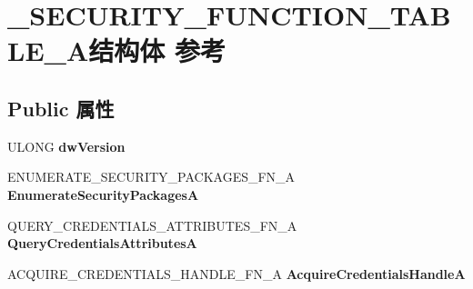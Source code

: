 \hypertarget{struct___s_e_c_u_r_i_t_y___f_u_n_c_t_i_o_n___t_a_b_l_e___a}{}\section{\+\_\+\+S\+E\+C\+U\+R\+I\+T\+Y\+\_\+\+F\+U\+N\+C\+T\+I\+O\+N\+\_\+\+T\+A\+B\+L\+E\+\_\+\+A结构体 参考}
\label{struct___s_e_c_u_r_i_t_y___f_u_n_c_t_i_o_n___t_a_b_l_e___a}
\subsection*{Public 属性}
\begin{DoxyCompactItemize}
\item 
\mbox{\label{struct___s_e_c_u_r_i_t_y___f_u_n_c_t_i_o_n___t_a_b_l_e___a_ac8229f76315b79cc90fe49938372a9fd}} 
U\+L\+O\+NG {\bfseries dw\+Version}
\item 
\mbox{\label{struct___s_e_c_u_r_i_t_y___f_u_n_c_t_i_o_n___t_a_b_l_e___a_ac1fd9c0f04f0239179fb86382871963b}} 
E\+N\+U\+M\+E\+R\+A\+T\+E\+\_\+\+S\+E\+C\+U\+R\+I\+T\+Y\+\_\+\+P\+A\+C\+K\+A\+G\+E\+S\+\_\+\+F\+N\+\_\+A {\bfseries Enumerate\+Security\+PackagesA}
\item 
\mbox{\label{struct___s_e_c_u_r_i_t_y___f_u_n_c_t_i_o_n___t_a_b_l_e___a_ad13d79952a66414cfbfbf15e6ccc37f9}} 
Q\+U\+E\+R\+Y\+\_\+\+C\+R\+E\+D\+E\+N\+T\+I\+A\+L\+S\+\_\+\+A\+T\+T\+R\+I\+B\+U\+T\+E\+S\+\_\+\+F\+N\+\_\+A {\bfseries Query\+Credentials\+AttributesA}
\item 
\mbox{\label{struct___s_e_c_u_r_i_t_y___f_u_n_c_t_i_o_n___t_a_b_l_e___a_a457fd78271be32faa39ed79bcd57c512}} 
A\+C\+Q\+U\+I\+R\+E\+\_\+\+C\+R\+E\+D\+E\+N\+T\+I\+A\+L\+S\+\_\+\+H\+A\+N\+D\+L\+E\+\_\+\+F\+N\+\_\+A {\bfseries Acquire\+Credentials\+HandleA}
\item 
\mbox{\label{struct___s_e_c_u_r_i_t_y___f_u_n_c_t_i_o_n___t_a_b_l_e___a_ae1e35f2d8338923ef9b2e1e8801311ca}} 

\end{DoxyCompactItemize}

